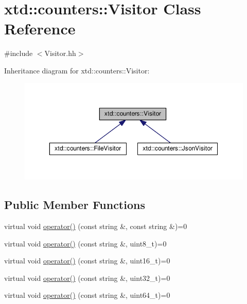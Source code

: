 \hypertarget{classxtd_1_1counters_1_1Visitor}{}\section{xtd\+:\+:counters\+:\+:Visitor Class Reference}
\label{classxtd_1_1counters_1_1Visitor}


{\ttfamily \#include $<$Visitor.\+hh$>$}



Inheritance diagram for xtd\+:\+:counters\+:\+:Visitor\+:
\nopagebreak
\begin{figure}[H]
\begin{center}
\leavevmode
\includegraphics[width=350pt]{classxtd_1_1counters_1_1Visitor__inherit__graph}
\end{center}
\end{figure}
\subsection*{Public Member Functions}
\begin{DoxyCompactItemize}
\item 
virtual void \hyperlink{classxtd_1_1counters_1_1Visitor_a1341281b8c4cbf4de5a37e035f75e214}{operator()} (const string \&, const string \&)=0
\item 
virtual void \hyperlink{classxtd_1_1counters_1_1Visitor_a1a5da2c523703b0c9132595f22e1700e}{operator()} (const string \&, uint8\+\_\+t)=0
\item 
virtual void \hyperlink{classxtd_1_1counters_1_1Visitor_a6139d735b720a83e87f49932855f1ade}{operator()} (const string \&, uint16\+\_\+t)=0
\item 
virtual void \hyperlink{classxtd_1_1counters_1_1Visitor_a0bc4c30e3df6ef796878b85ce1be17fb}{operator()} (const string \&, uint32\+\_\+t)=0
\item 
virtual void \hyperlink{classxtd_1_1counters_1_1Visitor_aba895c10dd1a28fa7a8b64e61adee5ac}{operator()} (const string \&, uint64\+\_\+t)=0
\end{DoxyCompactItemize}


